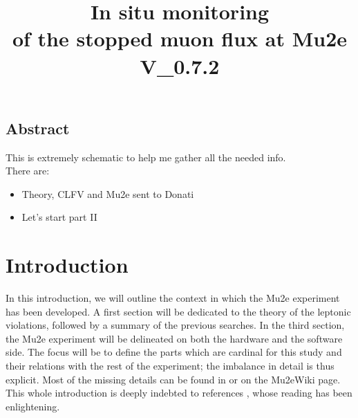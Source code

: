 \documentclass[12pt,a4paper,openright, oneside, titlepage]{book} %
\title{In situ monitoring\\ of the stopped muon flux at Mu2e\\\textbf{V\_0.7.2}}
\begin{document}
\frontmatter
	\begin{frontespizio}

	\end{frontespizio}

\maketitle
\chapter*{Abstract}
This is extremely schematic to help me gather all the needed info.\\
There are:
\begin{itemize}
\item Theory, CLFV and Mu2e sent to Donati
\item Let's start part II
\end{itemize}

\tableofcontents
\mainmatter
\part{Introduction}
In this introduction, we will outline the context in which the Mu2e experiment has been developed. A first section will be dedicated to the theory of the leptonic violations, followed by a summary of the previous searches. In the third section, the Mu2e experiment will be delineated on both the hardware and the software side. The focus will be  to define the parts which are cardinal for this study and their relations with the rest of the experiment; the imbalance in detail is thus explicit. Most of the missing details can be found in \cite{MTDR} or on the Mu2eWiki page.
This whole introduction is deeply indebted to references \cite{signorelli} \cite{bob_cflv} \cite{bob_mu2e} \cite{Manolis}, whose reading has been enlightening.
\end{document}
